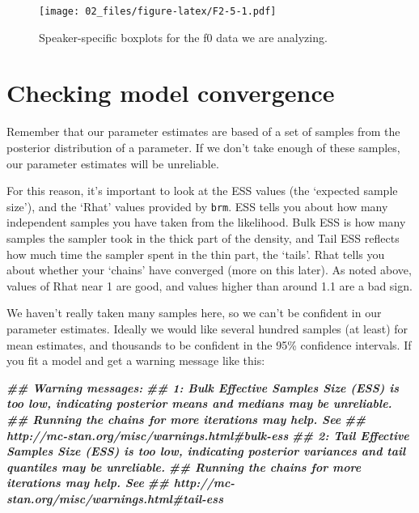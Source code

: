 \documentclass[
]{book}
\newenvironment{Shaded}{\begin{snugshade}}{\end{snugshade}}
\newcommand{\DocumentationTok}[1]{\textcolor[rgb]{0.56,0.35,0.01}{\textbf{\textit{#1}}}}
\begin{document}
\begin{figure}
\centering
\texttt{[image: 02\_files/figure-latex/F2-5-1.pdf]}
\caption{\label{fig:F2-5}Speaker-specific boxplots for the f0 data we are analyzing.}
\end{figure}

\hypertarget{checking-model-convergence}{%
\section{Checking model convergence}\label{checking-model-convergence}}

Remember that our parameter estimates are based of a set of samples from the posterior distribution of a parameter. If we don't take enough of these samples, our parameter estimates will be unreliable.

For this reason, it's important to look at the ESS values (the `expected sample size'), and the `Rhat' values provided by \texttt{brm}. ESS tells you about how many independent samples you have taken from the likelihood. Bulk ESS is how many samples the sampler took in the thick part of the density, and Tail ESS reflects how much time the sampler spent in the thin part, the `tails'. Rhat tells you about whether your `chains' have converged (more on this later). As noted above, values of Rhat near 1 are good, and values higher than around 1.1 are a bad sign.

We haven't really taken many samples here, so we can't be confident in our parameter estimates. Ideally we would like several hundred samples (at least) for mean estimates, and thousands to be confident in the 95\% confidence intervals. If you fit a model and get a warning message like this:

\begin{Shaded}
\begin{Highlighting}[]
\DocumentationTok{\#\# Warning messages:}
\DocumentationTok{\#\# 1: Bulk Effective Samples Size (ESS) is too low, indicating posterior means and medians may be unreliable.}
\DocumentationTok{\#\# Running the chains for more iterations may help. See}
\DocumentationTok{\#\# http://mc{-}stan.org/misc/warnings.html\#bulk{-}ess}
\DocumentationTok{\#\# 2: Tail Effective Samples Size (ESS) is too low, indicating posterior variances and tail quantiles may be unreliable.}
\DocumentationTok{\#\# Running the chains for more iterations may help. See}
\DocumentationTok{\#\# http://mc{-}stan.org/misc/warnings.html\#tail{-}ess}
\end{Highlighting}
\end{Shaded}
\end{document}
